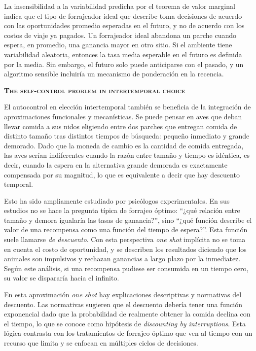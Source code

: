 \documentclass[a4paper,12pt]{article}
\begin{document}
La insensibilidad a la variabilidad predicha por el teorema de valor marginal indica que el tipo de forrajeador ideal que describe toma decisiones de acuerdo con las oportunidades promedio esperadas en el futuro, y no de acuerdo con los costos de viaje ya pagados. Un forrajeador ideal abandona un parche cuando espera, en promedio, una ganancia mayor en otro sitio. Si el ambiente tiene variabilidad aleatoria, entonces la tasa media esperable en el futuro es definida por la media. Sin embargo, el futuro solo puede anticiparse con el pasado, y un algoritmo sensible incluiría un mecanismo de ponderación en la recencia. 

{\scshape\bfseries The self-control problem in intertemporal choice}

El autocontrol en elección intertemporal también se beneficia de la integración de aproximaciones funcionales y mecanísticas. Se puede pensar en aves que deban llevar comida a sus nidos eligiendo entre dos parches que entregan comida de distinto tamaño tras distintos tiempos de búsqueda: pequeño inmediato y grande demorado. Dado que la moneda de cambio es la cantidad de comida entregada, las aves serían indiferentes cuando la razón entre tamaño y tiempo es idéntica, es decir, cuando la espera en la alternativa grande demorada es exactamente compensada por su magnitud, lo que es equivalente a decir que hay descuento temporal.

Esto ha sido ampliamente estudiado por psicólogos experimentales. En sus estudios no se hace la pregunta típica de forrajeo óptimo: ``¿qué relación entre tamaño y demora igualaría las tasas de ganancia?'', sino ``¿qué función describe el valor de una recompensa como una función del tiempo de espera?''. Esta función suele llamarse {\itshape de descuento}. Con esta perspectiva {\itshape one shot} implícita no se toma en cuenta el costo de oportunidad, y se describen los resultados diciendo que los animales son impulsivos y rechazan ganancias a largo plazo por la inmediatez. Según este análisis, si una recompensa pudiese ser consumida en un tiempo cero, su valor se dispararía hacia el infinito.

En esta aproximación {\itshape one shot} hay explicaciones descriptivas y normativas del descuento. Las normativas sugieren que el descuento debería tener una función exponencial dado que la probabilidad de realmente obtener la comida declina con el tiempo, lo que se conoce como hipótesis de {\itshape discounting by interruptions}. Esta lógica contrasta con los tratamientos de forrajeo óptimo que ven al tiempo con un recurso que limita y se enfocan en múltiples ciclos de decisiones.
\end{document}
